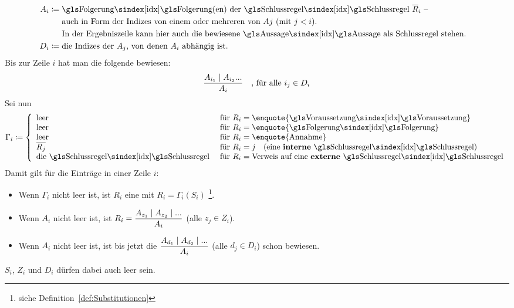 {\begin{align}
	\\
	A_i & \defeq \text{\Folgerung(en) der \glsIdx{Schlussregel} $\overline{R}_i$ --}\\
	& \quad\;\; \text{auch in Form der Indizes von einem oder mehreren von $Aj$ (mit $j < i$).}\\
	& \quad\;\; \text{In der Ergebniszeile kann hier auch die bewiesene \Aussage\ als Schlussregel stehen.}
	\\
	D_i & \defeq \text{die Indizes der $A_j$, von denen $A_i$ abhängig ist.}
\end{align}
Bis zur Zeile $i$ hat man die folgende  bewiesen:
\[ \frac{A_{i_1} \mid A_{i_2} ...}{A_i} \quad \text{, für alle } i_j \in D_i \]
Sei nun
\[
	\Gamma_i \defeq
	\left\{
		\begin{array}{ll}
			\text{leer}    & \text{ für } R_i = \text{\enquote{\Voraussetzung}} \\
			\text{leer}    & \text{ für } R_i = \text{\enquote{\Folgerung}}     \\
			\text{leer}    & \text{ für } R_i = \text{\enquote{Annahme}}        \\
			\overline{R_j} & \text{ für } R_i = j \quad \text{(eine \defn{interne} \glsIdx{Schlussregel})} \\
			\text{die \glsIdx{Schlussregel}} & \text{ für } R_i = \text{Verweis auf eine \defn{externe} \glsIdx{Schlussregel}}
		\end{array}
	\right.
\]
Damit gilt für die Einträge in einer Zeile $i$:
\begin{itemize}
	\item Wenn $\Gamma_i$ nicht leer ist, ist $R_i$ eine  mit $R_i = \Gamma_i(S_i)$%
	\footnote{%
		siehe Definition~\eqref{def:Substitutionen} 
	}.
	\item Wenn $A_i$ nicht leer ist, ist $R_i = \dfrac{A_{z_1} \mid A_{z_2} \mid ...}{A_i}$ (alle $z_j \in Z_i$).
	\item Wenn $A_i$ nicht leer ist, ist bis jetzt die  $\dfrac{A_{d_1} \mid A_{d_2} \mid ...}{A_i}$ (alle $d_j \in D_i$) schon bewiesen.
\end{itemize}
$S_i$, $Z_i$ und $D_i$ dürfen dabei auch leer sein.

}
